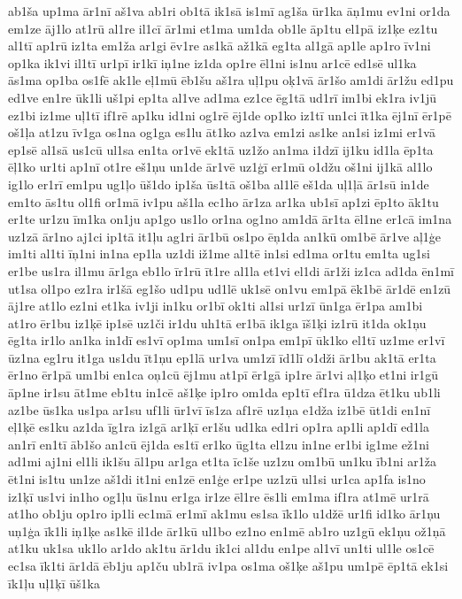 {ab1ša
up1ma
ār1nī
aš1va
ab1ri
ob1tā
ik1sā
is1mī
ag1ša
ūr1ka
āņ1mu
ev1ni
or1da
em1ze
āj1lo
at1rū
al1re
il1cī
ār1mi
et1ma
um1da
ob1le
āp1tu
el1pā
iz1ķe
ez1tu
al1tī
ap1rū
iz1ta
em1ža
ar1gi
ēv1re
as1kā
až1kā
eg1ta
al1gā
ap1le
ap1ro
īv1ni
op1ka
ik1vi
il1tī
ur1pī
ir1kī
iņ1ne
iz1da
op1re
ēl1ni
is1nu
ar1cē
ed1sē
ul1ka
ās1ma
op1ba
os1fē
ak1le
eļ1mū
ēb1šu
aš1ra
uļ1pu
oķ1vā
ār1šo
am1di
ār1žu
ed1pu
ed1ve
en1re
ūk1li
uš1pi
ep1ta
al1ve
ad1ma
ez1ce
ēg1tā
ud1rī
im1bi
ek1ra
iv1jū
ez1bi
iz1me
uļ1tī
if1rē
ap1ku
id1ni
og1rē
ēj1de
op1ko
iz1tī
un1ci
īt1ka
ēj1nī
ēr1pē
oš1ļa
at1zu
īv1ga
os1na
og1ga
es1lu
āt1ko
az1va
em1zi
as1ke
an1si
iz1mi
er1vā
ep1sē
al1sā
us1cū
ul1sa
en1ta
or1vē
ek1tā
uz1žo
an1ma
i1dzī
ij1ku
id1la
ēp1ta
ēļ1ko
ur1ti
ap1nī
ot1re
eš1ņu
un1de
ār1vē
uz1ģī
er1mū
o1džu
oš1ni
ij1kā
al1lo
ig1lo
er1rī
em1pu
ug1ļo
ūš1do
ip1ša
ūs1tā
oš1ba
al1lē
eš1da
uļ1ļā
ār1sū
in1de
em1to
ās1tu
ol1fi
or1mā
iv1pu
aš1la
ec1ho
ār1za
ar1ka
ub1sī
ap1zi
ēp1to
āk1tu
er1te
ur1zu
īm1ka
on1ju
ap1go
us1lo
or1na
og1no
am1dā
ār1ta
ēl1ne
er1cā
im1na
uz1zā
ār1no
aj1ci
ip1tā
it1ļu
ag1ri
ār1bū
os1po
ēņ1da
an1kū
om1bē
ār1ve
aļ1ģe
im1ti
al1ti
īņ1ni
in1na
ep1la
uz1di
iž1me
al1tē
in1si
ed1ma
or1tu
em1ta
ug1si
er1be
us1ra
il1mu
ār1ga
eb1lo
īr1rū
īt1re
al1la
et1vi
el1di
ār1ži
iz1ca
ad1da
ēn1mī
ut1sa
ol1po
ez1ra
ir1šā
eg1šo
ud1pu
ud1lē
uk1sē
on1vu
em1pā
ēk1bē
ār1dē
en1zū
āj1re
at1lo
ez1ni
et1ka
iv1ji
in1ku
or1bī
ok1ti
al1si
ur1zī
ūn1ga
ēr1pa
am1bi
at1ro
ēr1bu
iz1ķē
ip1sē
uz1či
ir1du
uh1tā
er1bā
ik1ga
īš1ķi
iz1rū
it1da
ok1ņu
ēg1ta
ir1lo
an1ka
in1dī
es1vī
op1ma
um1sī
on1pa
em1pī
ūk1ko
el1tī
uz1me
er1vī
ūz1na
eg1ru
it1ga
us1du
īt1ņu
ep1lā
ur1va
um1zī
īd1lī
o1dži
ār1bu
ak1tā
er1ta
ēr1no
ēr1pā
um1bi
en1ca
oņ1cū
ēj1mu
at1pī
ēr1gā
ip1re
ār1vi
aļ1ķo
et1ni
ir1gū
āp1ne
ir1su
āt1me
eb1tu
in1cē
aš1ķe
ip1ro
om1da
ep1tī
ef1ra
ū1dza
ēt1ku
ub1li
az1be
ūs1ka
us1pa
ar1su
uf1li
ūr1vī
īs1za
af1rē
uz1ņa
e1dža
iz1bē
ūt1di
en1nī
eļ1ķē
es1ku
az1da
īg1ra
iz1gā
ar1ķī
er1šu
ud1ka
ed1ri
op1ra
ap1li
ap1dī
ed1la
an1rī
en1tī
āb1šo
an1cū
ēj1da
es1tī
er1ko
ūg1ta
el1zu
in1ne
er1bi
ig1me
ež1ni
ad1mi
aj1ni
el1li
ik1šu
āl1pu
ar1ga
et1ta
īc1še
uz1zu
om1bū
un1ku
īb1ni
ar1ža
ēt1ni
is1tu
un1ze
aš1di
it1ni
en1zē
en1ģe
er1pe
uz1zū
ul1si
ur1ca
ap1fa
is1no
iz1ķī
us1vi
in1ho
og1ļu
ūs1nu
er1ga
ir1ze
ēl1re
ēs1li
em1ma
if1ra
at1mē
ur1rā
at1ho
ob1ju
op1ro
ip1li
ec1mā
er1mī
ak1mu
es1sa
īk1lo
u1džē
ur1fi
id1ko
ār1ņu
uņ1ģa
īk1li
iņ1ķe
as1kē
il1de
ār1kū
ul1bo
ez1no
en1mē
ab1ro
uz1gū
ek1ņu
ož1ņā
at1ku
uk1sa
uk1lo
ar1do
ak1tu
ār1du
ik1ci
al1du
en1pe
al1vī
un1ti
ul1le
os1cē
ec1sa
īk1ti
ār1dā
ēb1ju
ap1ču
ub1rā
iv1pa
os1ma
oš1ķe
aš1pu
um1pē
ēp1tā
ek1si
īk1ļu
uļ1ķī
ūš1ka
}
